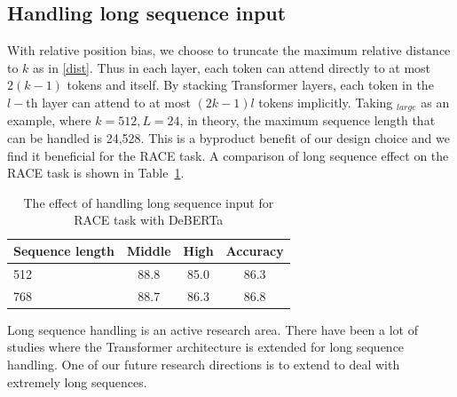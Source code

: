 \subsection{Handling long sequence input}
With relative position bias, we choose to truncate the maximum relative distance to $k$ as  in \eqref{dist}. Thus in each layer, each token can attend directly to at most $2(k-1)$ tokens and itself. By stacking Transformer layers, each token in the $l-$th layer can attend to at most $(2k-1)l$ tokens implicitly. Taking {\ModelName}$_{large}$ as an example, where $k=512, L=24$, in theory, the maximum sequence length that can be handled is 24,528. This is a byproduct benefit of our design choice and we find it beneficial for the RACE task. 
A comparison of long sequence effect on the RACE task is shown in Table~\ref{tab:race-long}.

\begin{table}[htb!]
    \centering
    \begin{tabular}{@{\hskip2pt}l@{\hskip3pt}|@{\hskip2pt} c@{\hskip2pt}| @{\hskip2pt}c@{\hskip2pt}| @{\hskip2pt}c@{\hskip2pt}}
        \toprule
        Sequence length& Middle &High &Accuracy \\
        \midrule
        512 & 88.8 & 85.0 & 86.3 \\
        768 & 88.7 & 86.3 & 86.8 \\
        \bottomrule
    \end{tabular}
    \caption{
    The effect of handling long sequence input for RACE task with DeBERTa
    }
    \label{tab:race-long}
\end{table}

Long sequence handling is an active research area. There have been a lot of studies where the Transformer architecture is extended for long sequence handling\citep{beltagy2020longformer, kitaev2020reformer, child2019generating, dai2019transformer}.  
One of our future research directions is to extend {\ModelName} to deal with extremely long sequences.


